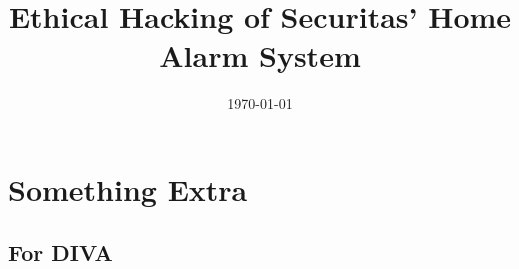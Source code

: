 \documentclass[english]{kththesis}
\date{\today}
\title{Ethical Hacking of Securitas' Home Alarm System}
\begin{document}

\label{pg:lastPageofPreface}

\mainmatter








\renewcommand{\bibname}{References}

\cleardoublepage

\appendix
\renewcommand{\chaptermark}[1]{\markboth{Appendix \thechapter\relax:\thinspace\relax#1}{}}
\chapter{Something Extra}

\label{pg:lastPageofMainmatter}

\clearpage
\section*{For DIVA}
\end{document}

